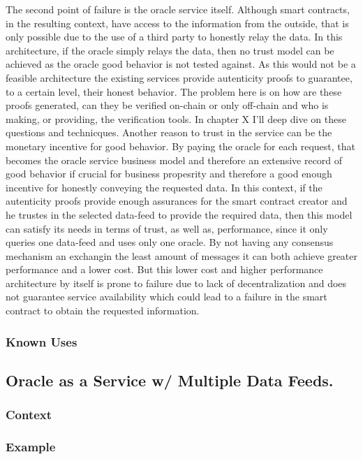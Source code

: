 The second point of failure is the oracle service itself. Although smart contracts, in the resulting context, have access to the information from the outside, that is only possible due to the use of a third party to honestly relay the data. In this architecture, if the oracle simply relays the data, then no trust model can be achieved as the oracle good behavior is not tested against. As this would not be a feasible architecture the existing services provide autenticity proofs to guarantee, to a certain level, their honest behavior. The problem here is on how are these proofs generated, can they be verified on-chain or only off-chain and who is making, or providing, the verification tools. In chapter X I'll deep dive on these questions and technicques. Another reason to trust in the service can be the monetary incentive for good behavior. By paying the oracle for each request, that becomes the oracle service business model and therefore an extensive record of good behavior if crucial for business propesrity and therefore a good enough incentive for honestly conveying the requested data.
In this context, if the autenticity proofs provide enough assurances for the smart contract creator and he trustes in the selected data-feed to provide the required data, then this model can satisfy its needs in terms of trust, as well as, performance, since it only queries one data-feed and uses only one oracle. By not having any consensus mechanism an exchangin the least amount of messages it can both achieve greater performance and a lower cost. But this lower cost and higher performance architecture by itself  is prone to failure due to lack of decentralization and does not guarantee service availability which could lead to a failure in the smart contract to obtain the requested information.




\subsubsection{Known Uses}

\subsection{Oracle as a Service w/ Multiple Data Feeds.}

\subsubsection{Context}
\subsubsection{Example}

